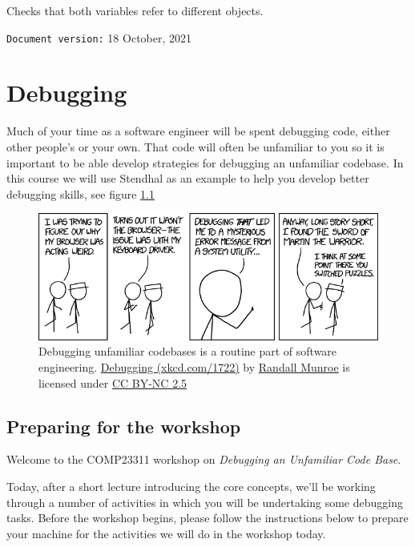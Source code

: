 \documentclass[
]{book}
\begin{document}
Checks that both variables refer to different objects.

\texttt{Document\ version:} 18 October, 2021

\hypertarget{debugging}{%
\chapter{Debugging}\label{debugging}}

Much of your time as a software engineer will be spent debugging code, either other people's or your own. That code will often be unfamiliar to you so it is important to be able develop strategies for debugging an unfamiliar codebase. In this course we will use Stendhal as an example to help you develop better debugging skills, see figure \ref{fig:xkcd-debugging-fig}

\begin{figure}

{\centering \includegraphics[width=0.99\linewidth]{images/debugging} 

}

\caption{Debugging unfamiliar codebases is a routine part of software engineering. \href{https://xkcd.com/1722/}{Debugging (xkcd.com/1722)} by \href{https://en.wikipedia.org/wiki/Randall_Munroe}{Randall Munroe} is licensed under \href{https://creativecommons.org/licenses/by-nc/2.5/}{CC BY-NC 2.5}}\label{fig:xkcd-debugging-fig}
\end{figure}



\hypertarget{preparing-for-the-workshop}{%
\section{Preparing for the workshop}\label{preparing-for-the-workshop}}

Welcome to the COMP23311 workshop on \emph{Debugging an Unfamiliar Code Base}.

Today, after a short lecture introducing the core concepts, we'll be working through a number of activities in which you will be undertaking some debugging tasks. Before the workshop begins, please follow the instructions below to prepare your machine for the activities we will do in the workshop today.
\end{document}
